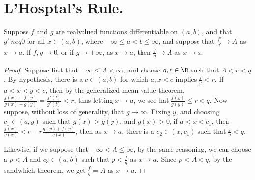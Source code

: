 
\section{L'Hosptal's Rule.}

\begin{theorem}\label{6.4.1}
    Suppose $f$ and  $g$ are realvalued functions differentiable on  $(a,b)$, and that
    $g' \ neq 0$ for all  $x \in (a,b)$, where $-\infty \leq a<b \leq \infty$, and suppose that
     $ \frac{f'}{g'} \rightarrow A$ as $x \rightarrow a$. If $f,g \rightarrow 0$, or if  $g \rightarrow \pm\infty$, as  $x \rightarrow a$,
     then  $ \frac{f}{g} \rightarrow A$ as $x \rightarrow a$.
\end{theorem}
\begin{proof}
    Suppose first that $-\infty \leq A<\infty$, and choose  $q,r \in \R$ such that $A<r<q$. By hypothesis,
    there is a $c \in (a,b)$ for which $a,x<c$ implies $\frac{f}{g}<r$. If $a<x<y<c$, then by the
    generalized mean value theorem, $ \frac{f(x)-f(y)}{g(x)-g(y)}=\frac{f'(t)}{g'(t)}<r$, thus
    letting $x \rightarrow a$, we see  hat $ \frac{f(y)}{g(y)} \leq r<q$. Now suppose, without loss
    of generality, that $g \rightarrow \infty$. Fixing $y$, and choosing  $c_1 \in (a,y)$ such that
    $g(x)>g(y)$, and  $g(x)>0$, if  $a<x<c_1$, then $ \frac{f(x)}{g(x)}<r-r\frac{g(y)+f(y)}{g(x)}$, then
    as $x \rightarrow a$, there is a  $c_2 \in (x,c_1)$ such that $ \frac{f}{g}<q$.

    Likewise, if we suppose that $-\infty<A \leq \infty$, by the same reasoning, we can choose a
    $p<A$ and $c_3 \in (a,b)$ such that $p<\frac{f}{g}$ as $x \rightarrow a$. Since  $p<A<q$,
    by the sandwhich theorem, we get  $ \frac{f}{g}=A$ as $x \rightarrow a$.
\end{proof}
